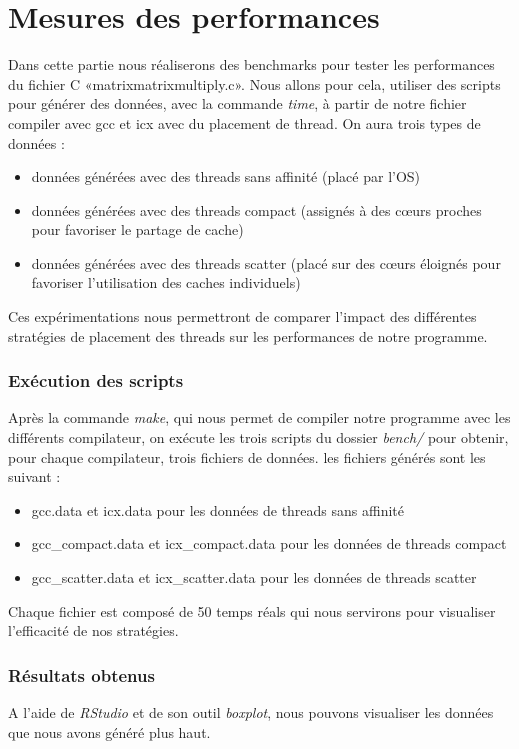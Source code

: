 \documentclass{rapport}
\begin{document}
  \part{Mesures des performances}
    Dans cette partie nous réaliserons des benchmarks pour tester les performances du fichier C «matrixmatrixmultiply.c».
    Nous allons pour cela, utiliser des scripts pour générer des données, avec la commande \textit{time}, à partir de notre fichier compiler avec gcc et icx avec du placement de thread. On aura trois types de données : 
    \begin{itemize}
        \item données générées avec des threads sans affinité (placé par l'OS)
        \item données générées avec des threads compact (assignés à des cœurs proches pour favoriser le partage de cache)
        \item données générées avec des threads scatter (placé sur des cœurs éloignés pour favoriser l'utilisation des caches individuels)
    \end{itemize}
    Ces expérimentations nous permettront de comparer l'impact des différentes stratégies de placement des threads sur les performances de notre programme.
    \section{Exécution des scripts}
    Après la commande \textit{make}, qui nous permet de compiler notre programme avec les différents compilateur,
        on exécute les trois scripts du dossier \textit{bench/} pour obtenir, pour chaque compilateur, trois fichiers de données.
        les fichiers générés sont les suivant : 
        \begin{itemize}
            \item gcc.data et icx.data pour les données de threads sans affinité
            \item gcc\_compact.data et icx\_compact.data pour les données de threads compact
            \item gcc\_scatter.data et icx\_scatter.data pour les données de threads scatter
        \end{itemize}
        Chaque fichier est composé de 50 temps réals qui nous servirons pour visualiser l'efficacité  de nos stratégies.
    
    \section{Résultats obtenus}
        A l'aide de \textit{RStudio} et de son outil \textit{boxplot}, nous pouvons visualiser les données que nous avons généré plus haut.
\end{document}
